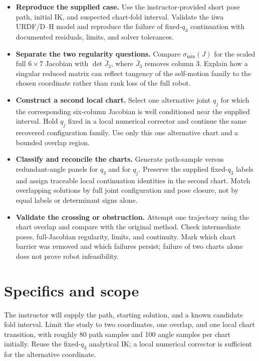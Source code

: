 \documentclass[11pt,a4paper]{article}
\begin{document}
\begin{itemize}
  \item \textbf{Reproduce the supplied case.} Use the instructor-provided short
pose path, initial IK, and suspected chart-fold interval. Validate the
iiwa URDF/D--H model and reproduce the failure of fixed-$q_3$ continuation
with documented residuals, limits, and solver tolerances.

  \item \textbf{Separate the two regularity questions.} Compare
$\sigma_{\min}(J)$ for the scaled full $6\times7$ Jacobian with
$\det\bar J_3$, where $\bar J_3$ removes column 3. Explain how a
singular reduced matrix can reflect tangency of the self-motion family
to the chosen coordinate rather than rank loss of the full robot.

  \item \textbf{Construct a second local chart.} Select one alternative joint
$q_j$ for which the corresponding six-column Jacobian is well conditioned
near the supplied interval. Hold $q_j$ fixed in a local numerical corrector
and continue the same recovered configuration family. Use only this one
alternative chart and a bounded overlap region.

  \item \textbf{Classify and reconcile the charts.} Generate path-sample versus
redundant-angle panels for $q_3$ and for $q_j$. Preserve the supplied
fixed-$q_3$ labels and assign traceable local continuation identities in
the second chart. Match overlapping solutions by full joint configuration
and pose closure, not by equal labels or determinant signs alone.

  \item \textbf{Validate the crossing or obstruction.} Attempt one trajectory
using the chart overlap and compare with the original method. Check
intermediate poses, full-Jacobian regularity, limits, and continuity.
Mark which chart barrier was removed and which failures persist; failure
of two charts alone does not prove robot infeasibility.
\end{itemize}

\newpage
\section*{Specifics and scope}
The instructor will supply the path, starting solution, and a known
candidate fold interval. Limit the study to two coordinates, one overlap,
and one local chart transition, with roughly 80 path samples and 100 angle
samples per chart initially. Reuse the fixed-$q_3$ analytical IK; a local
numerical corrector is sufficient for the alternative coordinate.
\end{document}
